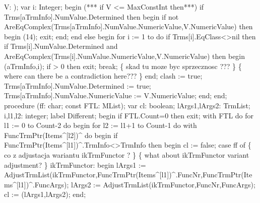                             V: );
var
   i: Integer;
begin
   (*** if V <= MaxConstInt then***)
   if Trms[aTrmInfo].NumValue.Determined then
   begin
      if not AreEqComplex(Trms[aTrmInfo].NumValue.NumericValue,V.NumericValue) then
      begin
         (14);
         exit;
      end;
   end
   else
   begin
      for i := 1 to  do
         if Trms[i].EqClass<>nil then
            if Trms[i].NumValue.Determined and
                  AreEqComplex(Trms[i].NumValue.NumericValue,V.NumericValue)  then
            begin
               (aTrmInfo,i);
               if  > 0 then exit;
               break;
               \{ skad tu moze byc sprzecznosc ??? \}
               \{ where can there be a contradiction here??? \}
            end;
      clash := true;
      Trms[aTrmInfo].NumValue.Determined := true;
      Trms[aTrmInfo].NumValue.NumericValue := V.NumericValue;
   end;
end;
\eatline
{}\nwendcode{}\nwdocspar
\nwenddocs{}\endmoddef\nwstartdeflinemarkup\nwenddeflinemarkup
procedure (ff: char;
              const FTL: MList);
var
   cl: boolean;
   lArgs1,lArgs2: TrmList;
   i,l1,l2: integer;
label Different;
begin
   if FTL.Count=0 then exit;
   with FTL do
      for l1 := 0 to Count-2 do
      begin
         for l2 := l1+1 to Count-1 do
            with FuncTrmPtr(Items^[l2])^ do
         begin
            if FuncTrmPtr(Items^[l1])^.TrmInfo<>TrmInfo then
            begin
               cl := false;
               case ff of
                  \{ co z adjustacja wariantu ikTrmFunctor ? \}
                  \{ what about ikTrmFunctor variant adjustment? \}
                  ikTrmFunctor:
                     begin
                        lArgs1 := AdjustTrmList(ikTrmFunctor,FuncTrmPtr(Items^[l1])^.FuncNr,FuncTrmPtr(Items^[l1])^.FuncArgs);
                        lArgs2 := AdjustTrmList(ikTrmFunctor,FuncNr,FuncArgs);
                        cl := (lArgs1,lArgs2);
                     end;

